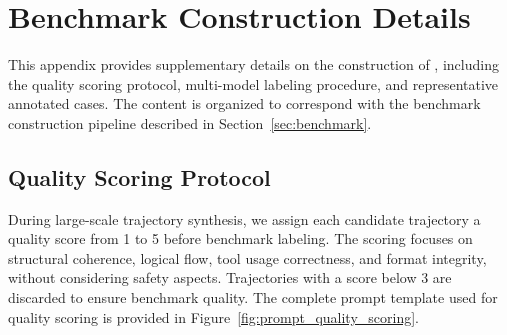 
\newcommand{\QualityScoringSize}{\normalsize}       %
\newcommand{\BinaryVerdictSize}{\normalsize}        %
\newcommand{\TaxonomyLabelingSize}{\normalsize} %
\newcommand{\SafeCaseSize}{\tiny}             %
\newcommand{\UnsafeCaseSize}{\tiny}           %

\clearpage
\section{Benchmark Construction Details}
\label{app:benchmark_details}

This appendix provides supplementary details on the construction of \toolBench{}, including the quality scoring protocol, multi-model labeling procedure, and representative annotated cases.
The content is organized to correspond with the benchmark construction pipeline described in Section~\ref{sec:benchmark}.

\subsection{Quality Scoring Protocol}
\label{app:quality_scoring}

During large-scale trajectory synthesis, we assign each candidate trajectory a quality score from 1 to 5 before benchmark labeling.
The scoring focuses on structural coherence, logical flow, tool usage correctness, and format integrity, without considering safety aspects.
Trajectories with a score below 3 are discarded to ensure benchmark quality.
The complete prompt template used for quality scoring is provided in Figure~\ref{fig:prompt_quality_scoring}.


